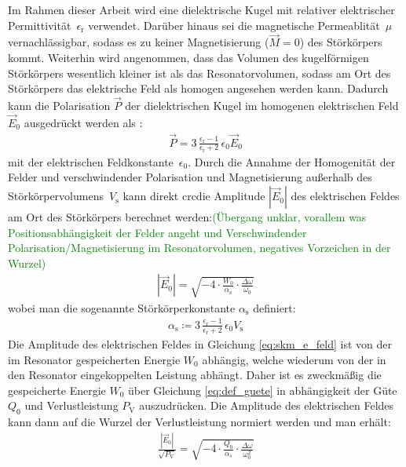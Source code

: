 \documentclass[11pt, a4paper]{scrbook}
\newcommand{\ve}{\vec{E}}
\newcommand{\todo}[1]{{\textcolor{Green}{(#1)}}}
\begin{document}
	Im Rahmen dieser Arbeit wird eine dielektrische Kugel mit relativer elektrischer Permittivität~$\epsilon_\mathrm{r}$ verwendet.
	Darüber hinaus sei die magnetische Permeablität~$\mu$ vernachlässigbar, sodass es zu keiner Magnetisierung ($\vec{M} = 0$) des Störkörpers kommt.
	Weiterhin wird angenommen, dass das Volumen des kugelförmigen Störkörpers wesentlich kleiner ist als das Resonatorvolumen, sodass am Ort des Störkörpers das elektrische Feld als homogen angesehen werden kann.
	Dadurch kann die Polarisation $\vec{P}$ der dielektrischen Kugel im homogenen elektrischen Feld $\ve_0$ ausgedrückt werden als \cite{jackson}:
	\begin{align}
		\vec{P} = 3 \, \frac{\epsilon_\mathrm{r} - 1}{\epsilon_\mathrm{r} + 2} \, \epsilon_0 \ve_0
		\label{eq:polarisation_kugel}
	\end{align}
	mit der elektrischen Feldkonstante~$\epsilon_0$.
	Durch die Annahme der Homogenität der Felder und verschwindender Polarisation und Magnetisierung außerhalb des Störkörpervolumens~$V_\mathrm{s}$ kann direkt crcdie Amplitude $|\ve_0|$ des elektrischen Feldes am Ort des Störkörpers berechnet werden:\todo{Übergang unklar, vorallem was Positionsabhängigkeit der Felder angeht und Verschwindender Polarisation/Magnetisierung im Resonatorvolumen, negatives Vorzeichen in der Wurzel}
	\begin{align}
		|\ve_0| = \sqrt{-4 \cdot \frac{W_0}{\alpha_\mathrm{s}} \cdot \frac{\Delta \omega}{\omega_0}} \label{eq:skm_e_feld}
	\end{align}
	wobei man die sogenannte Störkörperkonstante $\alpha_\mathrm{s}$ definiert:
	\begin{align}
		\alpha_\mathrm{s} \coloneqq 3 \, \frac{\epsilon_\mathrm{r} - 1}{\epsilon_\mathrm{r} + 2} \, \epsilon_0 V_\mathrm{s}
	\end{align}
	Die Amplitude des elektrischen Feldes in Gleichung \eqref{eq:skm_e_feld} ist von der im Resonator gespeicherten Energie $W_0$ abhängig, welche wiederum von der in den Resonator eingekoppelten Leistung abhängt.
	Daher ist es zweckmäßig die gespeicherte Energie $W_0$ über Gleichung \eqref{eq:def_guete} in abhängigkeit der Güte $Q_0$ und Verlustleistung $P_\mathrm{V}$ auszudrücken.
	Die Amplitude des elektrischen Feldes kann dann auf die Wurzel der Verlustleistung normiert werden und man erhält:
	\begin{align}
		\frac{|\ve_0|}{\sqrt{P_\mathrm{V}}} = \sqrt{-4 \cdot \frac{Q_0}{\alpha_s} \cdot \frac{\Delta \omega}{\omega_0^2}}
	\end{align}	
	
\end{document}
